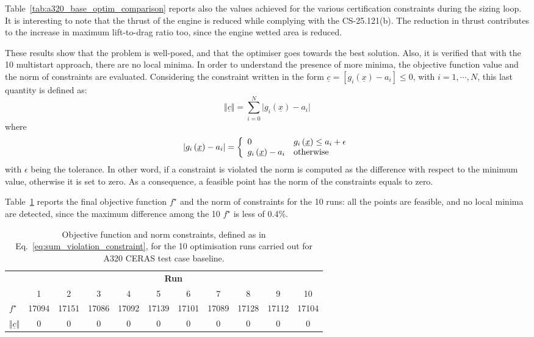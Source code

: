 Table~\ref{tab:a320_base_optim_comparison} reports also the values achieved for the various certification constraints during the sizing loop. 
It is interesting to note that the thrust of the engine is reduced while complying with the CS-25.121(b).
The reduction in thrust contributes to the increase in maximum lift-to-drag ratio too, since the engine wetted area is reduced. 

These results show that the problem is well-posed, and that the optimiser goes towards the best solution. 
Also, it is verified that with the 10 multistart approach, there are no local minima. 
In order to understand the presence of more minima, the objective function value and the norm of constraints are evaluated.
Considering the constraint written in the form $\underline{c}=[g_i\left(\underline{x}\right)-a_i]\leq0$, with $i=1,\cdots,N$, this last quantity is defined as: 
\begin{equation}
	\label{eq:norm_constraint}
	\Vert \underline c \Vert = \sum_{i=0}^{N}\vert g_i\left(\underline{x}\right)-a_i \vert
\end{equation}
where 
\begin{equation}
	\label{eq:sum_violation_constraint}
	\vert g_i\left(\underline{x}\right)-a_i \vert = \left\{
	\begin{array}{l l}
		0 & g_i\left(\underline{x}\right) \leq a_i + \epsilon \\
		g_i\left(\underline{x}\right)-a_i & \textrm{otherwise}
	\end{array} \right.
\end{equation}
with $\epsilon$ being the tolerance.
In other word, if a constraint is violated the norm is computed as the difference with respect to the minimum value, otherwise it is set to zero. 
As a consequence, a feasible point has the norm of the constraints equals to zero. 

Table~\ref{tab:a320_base_optim_multipoint_result} reports the final objective function $f^\star$ and the norm of constraints for the 10 runs: all the points are feasible, and no local minima are detected, since the maximum difference among the 10 $f^\star$ is less of 0.4\%.
\begin{table}[!h]
	\centering
	\begin{tabular}{l c c c c c c c c c c}
		\cline{2-11}
		& \multicolumn{10}{c}{\textbf{Run}} \\
		\cline{2-11}
		& 1 & 2 & 3 & 4 & 5 & 6 & 7 & 8 & 9 & 10 \\
		\hline
		$f^\star$ & 17094 & 17151 & 17086 & 17092 & 17139 & 17101 & 17089 & 17128 & 17112 & 17104 \\
		$\Vert \underline c \Vert$ & 0 & 0 & 0 & 0 & 0 & 0 & 0 & 0 & 0 & 0\\
		\hline
	\end{tabular}
	\caption{Objective function and norm constraints, defined as in Eq.~\eqref{eq:sum_violation_constraint}, for the 10 optimisation runs carried out for A320 CERAS test case baseline.}
	\label{tab:a320_base_optim_multipoint_result}
\end{table}

